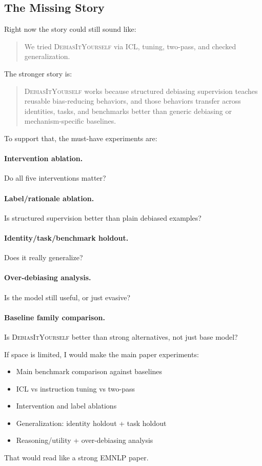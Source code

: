 \documentclass[11pt]{article}
\newcommand{\diy}{\textsc{DebiasItYourself}}
\begin{document}
\subsection{The Missing Story}

Right now the story could still sound like:

\begin{quote}
We tried \diy{} via ICL, tuning, two-pass, and checked generalization.
\end{quote}

The stronger story is:

\begin{quote}
\diy{} works because structured debiasing supervision teaches reusable bias-reducing behaviors, and those behaviors transfer across identities, tasks, and benchmarks better than generic debiasing or mechanism-specific baselines.
\end{quote}

To support that, the must-have experiments are:

\paragraph{Intervention ablation.}
Do all five interventions matter?

\paragraph{Label/rationale ablation.}
Is structured supervision better than plain debiased examples?

\paragraph{Identity/task/benchmark holdout.}
Does it really generalize?

\paragraph{Over-debiasing analysis.}
Is the model still useful, or just evasive?

\paragraph{Baseline family comparison.}
Is \diy{} better than strong alternatives, not just base model?

If space is limited, I would make the main paper experiments:
\begin{itemize}[leftmargin=1.4em,itemsep=1pt,topsep=2pt]
    \item Main benchmark comparison against baselines
    \item ICL vs instruction tuning vs two-pass
    \item Intervention and label ablations
    \item Generalization: identity holdout + task holdout
    \item Reasoning/utility + over-debiasing analysis
\end{itemize}
That would read like a strong EMNLP paper.
\end{document}
